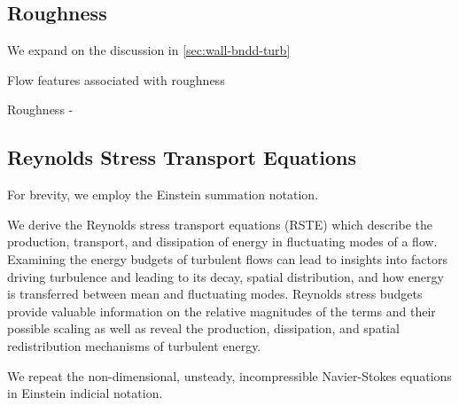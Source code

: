 

\subsection{Roughness}
We expand on the discussion in \autoref{sec:wall-bndd-turb} 


Flow features associated with roughness\cite{roughwalls}

Roughness - \cite{nakayama2002}\cite{roughwalls}

\subsection{Reynolds Stress Transport Equations}

For brevity, we employ the Einstein summation notation.
 
We derive the Reynolds stress transport equations (RSTE) which describe the production, transport, and dissipation of energy in fluctuating modes of a flow. Examining the energy budgets of turbulent flows can lead to insights into factors driving turbulence and leading to its decay, spatial distribution, and how energy is transferred between mean and fluctuating modes. Reynolds stress budgets provide valuable information on the relative magnitudes of the terms and their possible scaling as well as reveal the production, dissipation, and spatial redistribution mechanisms of turbulent energy.

We repeat the non-dimensional, unsteady, incompressible Navier-Stokes equations in Einstein indicial notation.

